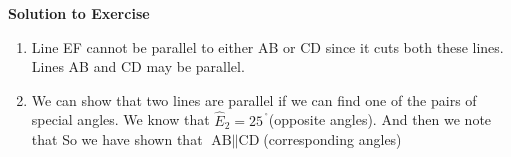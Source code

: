 \begin{table}[H]
{\begin{mdframed}[linewidth=4, leftmargin=40, rightmargin=40]
\begin{exercise}
\label{m38380*eip-668}\noindent\textbf{Solution to Exercise }
  \label{m38380*eip-82}\begin{enumerate}[noitemsep, label=\textbf{Step} \textbf{\arabic*}. ] 
            \leftskip=20pt\rightskip=\leftskip\item Line EF cannot be parallel to either AB or CD since it cuts both these lines. Lines AB and CD may be parallel.\item We can show that two lines are parallel if we can find one of the pairs of special angles. We know that 
\begin{math}{\hat{E}}_{2}={25}^{\ensuremath{{\,}^{\circ}}}\end{math}(opposite angles). And then we note that 
\label{m38380*eid6634}\nopagebreak\noindent{}
     So we have shown that 
\begin{math}\text{AB}\parallel \text{CD}\end{math}\hspace{1ex}(corresponding angles)\end{enumerate}
        



\end{exercise}
\end{mdframed}}
\end{table}
